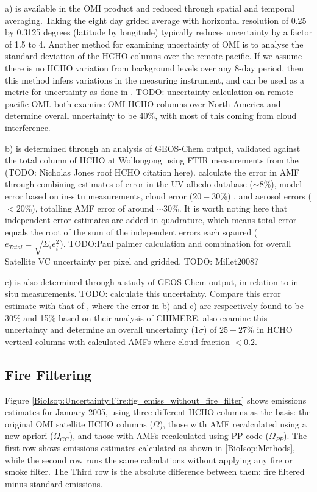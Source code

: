     a) is available in the OMI product and reduced through spatial and temporal averaging.
    Taking the eight day grided average with horizontal resolution of 0.25 by 0.3125 degrees (latitude by longitude) typically reduces uncertainty by a factor of 1.5 to 4.
    Another method for examining uncertainty of OMI is to analyse the standard deviation of the HCHO columns over the remote pacific.
    If we assume there is no HCHO variation from background levels over any 8-day period, then this method infers variations in the measuring instrument, and can be used as a metric for uncertainty as done in \textcite{DeSmedt2012}.
    TODO: uncertainty calculation on remote pacific OMI.
    \textcite{Millet2006, Palmer2006} both examine OMI HCHO columns over North America and determine overall uncertainty to be 40\%, with most of this coming from cloud interference.
    
    b) is determined through an analysis of GEOS-Chem output, validated against the total column of HCHO at Wollongong using FTIR measurements from the (TODO: Nicholas Jones roof HCHO citation here).
    \textcite{Palmer2006} calculate the error in AMF through combining estimates of error in the UV albedo database ($\sim 8$\%), model error based on in-situ measurements, cloud error  ($20-30$\%) \parencite{Martin2003}, and aerosol errors ($<20$\%), totalling AMF error of around $\sim 30$\%.
    It is worth noting here that independent error estimates are added in quadrature, which means total error equals the root of the sum of the independent errors each sqaured ($e_{Total}=\sqrt{\Sigma_i e_i^2}$).
    TODO:Paul palmer calculation and combination for overall Satellite VC uncertainty per pixel and gridded.
    TODO: Millet2008?
    
    c) is also determined through a study of GEOS-Chem output, in relation to in-situ measurements.
    TODO: calculate this uncertainty.
    Compare this error estimate with that of \textcite{Curci2010}, where the error in b) and c) are respectively found to be 30\% and 15\% based on their analysis of CHIMERE.
    \textcite{Millet2008} also examine this uncertainty and determine an overall uncertainty ($1\sigma$) of $25-27\%$ in HCHO vertical columns with calculated AMFs where cloud fraction $< 0.2$.
    
  \subsection{Fire Filtering}
    
    Figure \ref{BioIsop:Uncertainty:Fire:fig_emiss_without_fire_filter} shows emissions estimates for January 2005, using three different HCHO columns as the basis: the original OMI satellite HCHO columns ($\Omega$), those with AMF recalculated using a new apriori ($\Omega_{GC}$), and those with AMFs recalculated using PP code ($\Omega_{PP}$).
    The first row shows emissions estimates calculated as shown in \ref{BioIsop:Methods}, while the second row runs the same calculations without applying any fire or smoke filter.
    The Third row is the absolute difference between them: fire filtered minus standard emissions.
    
